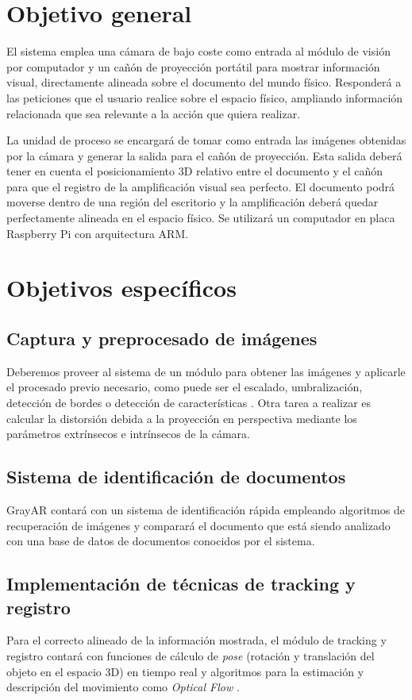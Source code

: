 \section{Objetivo general}
El sistema emplea una cámara de bajo coste como entrada al módulo de visión por computador y un cañón de proyección portátil para mostrar información visual, directamente alineada sobre el documento del mundo físico. Responderá a las peticiones que el usuario realice sobre el espacio físico, ampliando información relacionada que sea relevante a la acción que quiera realizar.

La unidad de proceso se encargará de tomar como entrada las imágenes obtenidas por la cámara y generar la salida para el cañón de proyección. Esta salida deberá tener en cuenta el posicionamiento 3D relativo entre el documento y el cañón para que el registro de la amplificación visual sea perfecto. El documento podrá moverse dentro de una región del escritorio y la amplificación deberá quedar perfectamente alineada en el espacio físico. Se utilizará un computador en placa Raspberry Pi con arquitectura \acs{ARM}.

\section{Objetivos específicos}

\subsection{Captura y preprocesado de imágenes}
Deberemos proveer al sistema de un módulo para obtener las imágenes y aplicarle el procesado previo necesario, como puede ser el escalado, umbralización, detección de bordes o detección de características \cite{Ortiz} \cite{Bay}. Otra tarea a realizar es calcular la distorsión debida a la proyección en perspectiva mediante los parámetros extrínsecos e intrínsecos de la cámara.

\subsection{Sistema de identificación de documentos}
GrayAR contará con un sistema de identificación rápida empleando algoritmos de recuperación de imágenes y comparará el documento que está siendo analizado con una base de datos de documentos conocidos por el sistema.

\subsection{Implementación de técnicas de tracking y registro}
Para el correcto alineado de la información mostrada, el módulo de tracking y registro contará con funciones de cálculo de \emph{pose} (rotación y translación del objeto en el espacio 3D) en tiempo real y algoritmos para la estimación y descripción del movimiento como \textit{Optical Flow} \cite{LKanade}.   

